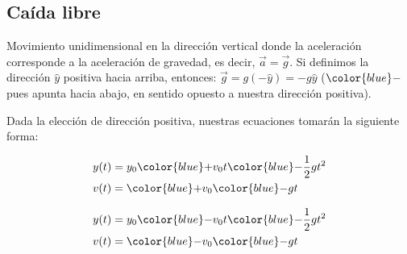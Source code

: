 \documentclass[letterpaper,11pt]{article}
\begin{document}
\subsection*{Caída libre}
\label{caida libre}
\hspace{-2em}
\begin{minipage}{0.85\textwidth}
    \setlength{\parindent}{15pt} Movimiento unidimensional en la dirección vertical donde la aceleración corresponde a la aceleración de gravedad, es decir, $\vec{a} = \vec{g}$. \newline
    Si definimos la dirección $\hat{y}$ positiva hacia arriba, entonces: $\vec{g} = g(-\hat{y}) = -g\hat{y}$ ($\color{blue} -$ pues apunta hacia abajo, en sentido opuesto a nuestra dirección positiva).
\end{minipage}
\hfill
\begin{minipage}{0.1\textwidth}
    \begin{figure}[H]
        \centering
        
    \end{figure}
\end{minipage}

\noindent Dada la elección de dirección positiva, nuestras ecuaciones tomarán la siguiente forma:

\begin{center}
    \begin{minipage}{0.1\textwidth}
        \begin{figure}[H]
            \centering
            
        \end{figure}
    \end{minipage}
    \hspace{1em}
    \begin{minipage}{0.\textwidth}
        \begin{align*}
            & y(t) = y_0 {\color{blue}+} v_0t {\color{blue}-} \frac{1}{2}gt^2 \\
            & v(t) = {\color{blue}+} v_0 {\color{blue}-} gt
        \end{align*}
    \end{minipage}
    \hspace{2em}
    \vline
    \hspace{2em}
    \begin{minipage}{0.1\textwidth}
        \begin{figure}[H]
            \centering
            
        \end{figure}
    \end{minipage}
    \hspace{1em}
    \begin{minipage}{0.\textwidth}
        \begin{align*}
            & y(t) = y_0 {\color{blue}-} v_0t {\color{blue}-} \frac{1}{2}gt^2 \\
            & v(t) = {\color{blue}-} v_0 {\color{blue}-} gt
        \end{align*}
    \end{minipage}
\end{center}
\end{document}
